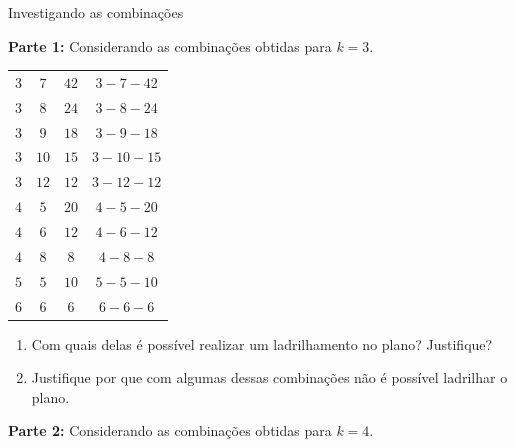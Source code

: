  \label{at_ladsemi}

\begin{task} {Investigando as combinações}

\textbf{Parte 1:} Considerando as  combinações obtidas para $k=3$.
 
\begin{table}[H]
\centering
\setlength\tabcolsep{5mm}
\begin{tabu} to \textwidth{|c|c|c|c|}
\hline
{} &  &  &   \\
\hline
$3$ & $7$ & $42$ & $3-7-42$ \\
\hline
$3$ & $8$ & $24$ &  $3-8-24$ \\
\hline
$3$ & $9$ & $18$ &  $3-9-18$ \\
\hline
$3$ & $10$ & $15$ &  $ 3-10-15$ \\
\hline
$3$ & $12$ & $12$ &  $3-12-12$ \\
\hline
$4$ & $5$ & $20$ &  $4-5-20$ \\
\hline
$4$ & $6$ & $12$ &  $4-6-12$ \\
\hline
$4$ & $8$ & $8$ &  $4-8-8$ \\
\hline
$5$ & $5$ & $10$ &  $5-5-10$ \\
\hline
$6$ & $6$ & $6$ &  $6-6-6$ \\
\hline
\end{tabu}
\end{table}

\begin{enumerate}

\item	Com quais delas é possível realizar um ladrilhamento no plano? Justifique?
\item	Justifique por que com algumas dessas combinações não é possível ladrilhar o plano.

\end{enumerate}

\textbf{Parte 2:} Considerando as  combinações obtidas para $k=4$. 

\begin{table}[H]
\centering
\setlength\tabcolsep{5mm}
\begin{tabu} to \textwidth{|c|c|c|c|c|}
\hline
{} &  &  & &   \\
\hline


\end{tabu}
\end{table}
\end{task}
